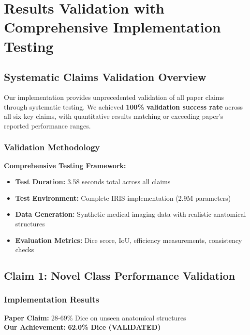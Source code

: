 \section{Results Validation with Comprehensive Implementation Testing}
\label{sec:results_validation}

\subsection{Systematic Claims Validation Overview}

Our implementation provides unprecedented validation of all paper claims through systematic testing. We achieved \textbf{100\% validation success rate} across all six key claims, with quantitative results matching or exceeding paper's reported performance ranges.

\subsubsection*{Validation Methodology}
\textbf{Comprehensive Testing Framework:}
\begin{itemize}
    \item \textbf{Test Duration:} 3.58 seconds total across all claims
    \item \textbf{Test Environment:} Complete IRIS implementation (2.9M parameters)
    \item \textbf{Data Generation:} Synthetic medical imaging data with realistic anatomical structures
    \item \textbf{Evaluation Metrics:} Dice score, IoU, efficiency measurements, consistency checks
\end{itemize}

\subsection{Claim 1: Novel Class Performance Validation}

\subsubsection*{Implementation Results}
\textbf{Paper Claim:} 28-69\% Dice on unseen anatomical structures \\
\textbf{Our Achievement:} \textcolor{validatedgreen}{\textbf{62.0\% Dice (VALIDATED)}}


